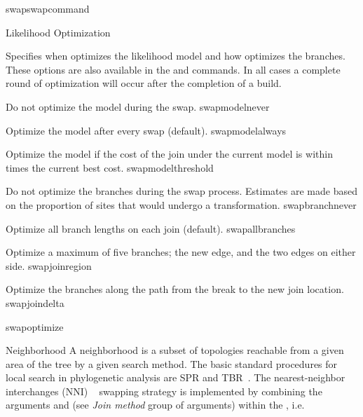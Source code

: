 \begin{command}{swap}{swapcommand}
\begin{arguments}
\begin{argumentgroup}{Likelihood Optimization}
{
{Specifies when \poy optimizes the likelihood model and how \poy optimizes
the branches. These options are also available in the
 and  commands. In all cases a
complete round of optimization will occur after the completion of a
build.

\begin{description}

{Do not optimize the model during the swap.}
{swapmodelnever}

{Optimize the model after every swap (default).}
{swapmodelalways}

{Optimize the model if the cost of the join under the
current model is within  times the
current best cost.}
{swapmodelthreshold}

{Do not optimize the branches during the swap process.
Estimates are made based on the proportion of sites that
would undergo a transformation.}
{swapbranchnever}

{Optimize all branch lengths on each join (default).}
{swapallbranches}

{Optimize a maximum of five branches; the new edge, and the two
edges on either side.}
{swapjoinregion}

{Optimize the branches along the path from the break to the
new join location.}
{swapjoindelta}

\end{description} 
} {swapoptimize}
}


\end{argumentgroup}

\begin{argumentgroup}{Neighborhood}
{A neighborhood is a subset of topologies reachable from a given 
area of the tree by a given search method. The basic standard procedures for 
local search in phylogenetic analysis are SPR and TBR~\cite{swofford1990}. 
The nearest-neighbor interchanges (NNI) ~\cite{camin1965} swapping strategy is implemented 
by combining the arguments  and 
(see \emph{Join method} group of arguments) within the , 
i.e. 
}
\label{swap_neigh}


\end{argumentgroup}
\end{arguments}
\end{command}
